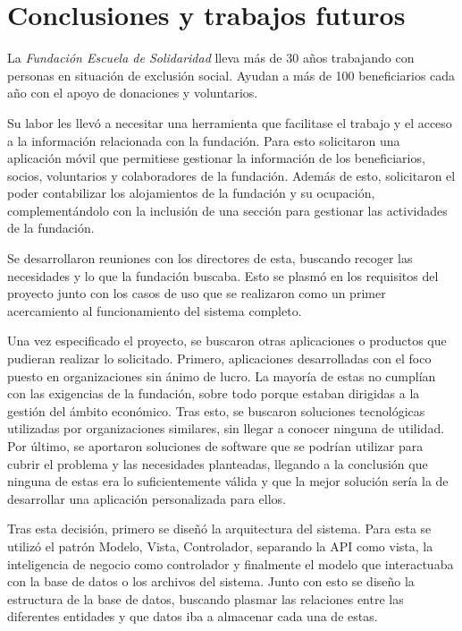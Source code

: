 \chapter{Conclusiones y trabajos futuros}

La \textit{Fundación Escuela de Solidaridad} lleva más de 30 años trabajando con personas en situación de exclusión social. Ayudan a más de 100 beneficiarios cada año con el apoyo de donaciones y voluntarios.

Su labor les llevó a necesitar una herramienta que facilitase el trabajo y el acceso a la información relacionada con la fundación. Para esto solicitaron una aplicación móvil que permitiese gestionar la información de los beneficiarios, socios, voluntarios y colaboradores de la fundación. Además de esto, solicitaron el poder contabilizar los alojamientos de la fundación y su ocupación, complementándolo con la inclusión de una sección para gestionar las actividades de la fundación. 

Se desarrollaron reuniones con los directores de esta, buscando recoger las necesidades y lo que la fundación buscaba. Esto se plasmó en los requisitos del proyecto junto con los casos de uso que se realizaron como un primer acercamiento al funcionamiento del sistema completo. 

Una vez especificado el proyecto, se buscaron otras aplicaciones o productos que pudieran realizar lo solicitado. Primero, aplicaciones desarrolladas con el foco puesto en organizaciones sin ánimo de lucro. La mayoría de estas no cumplían con las exigencias de la fundación, sobre todo porque estaban dirigidas a la gestión del ámbito económico. Tras esto, se buscaron soluciones tecnológicas utilizadas por organizaciones similares, sin llegar a conocer ninguna de utilidad. Por último, se aportaron soluciones de software que se podrían utilizar para cubrir el problema y las necesidades planteadas, llegando a la conclusión que ninguna de estas era lo suficientemente válida y que la mejor solución sería la de desarrollar una aplicación personalizada para ellos. 

Tras esta decisión, primero se diseñó la arquitectura del sistema. Para esta se utilizó el patrón Modelo, Vista, Controlador, separando la API como vista, la inteligencia de negocio como controlador y finalmente el modelo que interactuaba con la base de datos o los archivos del sistema. Junto con esto se diseño la estructura de la base de datos, buscando plasmar las relaciones entre las diferentes entidades y que datos iba a almacenar cada una de estas. 

